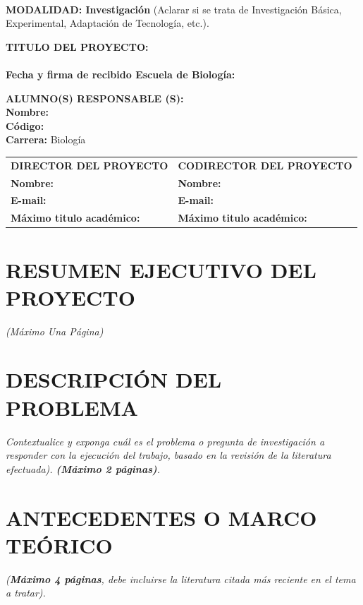 \documentclass[12pt,letterpaper]{article}
\begin{document}
\renewcommand{\refname}{BIBLIOGRAFÍA}
\
\begin{framed}
\textbf{MODALIDAD: Investigación} (Aclarar si se trata de Investigación Básica, Experimental, Adaptación de Tecnología, etc.).
\end{framed}
\begin{framed}
\textbf{TITULO DEL PROYECTO:}\\
\\
\textbf{Fecha y firma de recibido Escuela de Biología:}\\

\end{framed}

\begin{framed}
\textbf{ALUMNO(S) RESPONSABLE (S):}\\
\textbf{Nombre:}\\
\textbf{Código:}\\
\textbf{Carrera:} Biología
\end{framed}
\begin{flushleft}
\begin{tabular}{|K{7.35cm}|K{7.35cm}|}
\hline

\textbf{DIRECTOR DEL PROYECTO} & \textbf{CODIRECTOR DEL PROYECTO} \\
\textbf{Nombre:} & \textbf{Nombre:} \\
\textbf{E-mail:} & \textbf{E-mail:} \\
\textbf{Máximo titulo académico:} & \textbf{Máximo titulo académico:}\\
\hline
\end{tabular}
\end{flushleft}

\section{RESUMEN EJECUTIVO DEL PROYECTO}
\emph{(Máximo Una Página)}
\section{DESCRIPCIÓN DEL PROBLEMA}
\emph{Contextualice y exponga cuál es el problema o pregunta de investigación a responder con la ejecución del trabajo, basado en la revisión de la literatura efectuada). \textbf{(Máximo 2 páginas)}.}\\

\section{ANTECEDENTES O MARCO TEÓRICO}
\emph{(\textbf{Máximo 4 páginas}, debe incluirse la literatura citada más reciente en el tema a tratar).}
\end{document}

